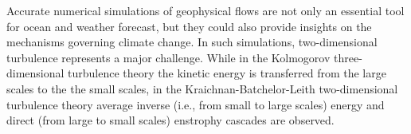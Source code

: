 \documentclass[11pt,a4paper]{article}
\begin{document}
Accurate numerical simulations of geophysical flows are not only an essential tool for ocean and weather forecast,
but they could also provide insights on the mechanisms governing climate change. 
In such simulations, two-dimensional turbulence represents a major challenge.
While in the Kolmogorov three-dimensional turbulence theory \cite{Kolmogorov41-1, Kolmogorov41-2} the kinetic energy 
is transferred from the large scales to the the small scales,  in the Kraichnan-Batchelor-Leith two-dimensional turbulence 
theory \cite{Kraichnan1967, Batchelor1969, Leith1971} %
average inverse (i.e., from small to large scales) energy and direct (from large to small scales) 
enstrophy cascades are observed. 
\end{document}
